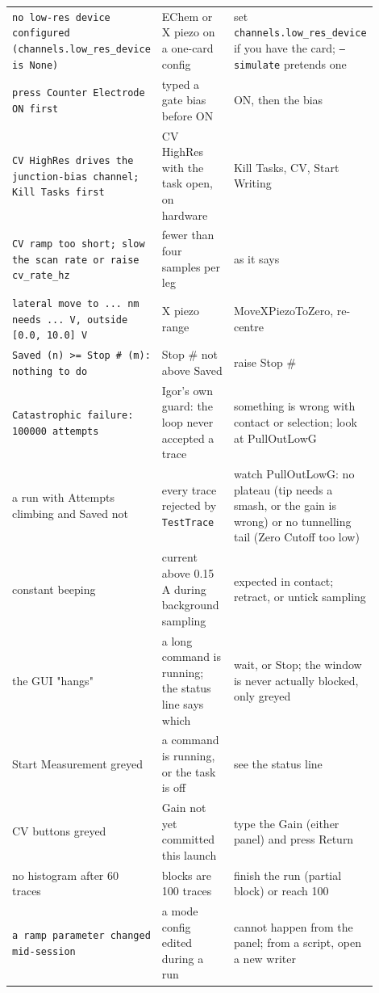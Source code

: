 \begin{longtable}{@{}>{\raggedright\arraybackslash}p{0.26\linewidth}>{\raggedright\arraybackslash}p{0.30\linewidth}>{\raggedright\arraybackslash}p{0.34\linewidth}@{}}
\texttt{no low-res device configured (channels.\discretionary{}{}{}low\_\discretionary{}{}{}res\_\discretionary{}{}{}device is None)} & EChem or X piezo on a one-card config & set \texttt{channels.\discretionary{}{}{}low\_\discretionary{}{}{}res\_\discretionary{}{}{}device} if you have the card; \texttt{--simulate} pretends one \\
\texttt{press Counter Electrode ON first} & typed a gate bias before ON & ON, then the bias \\
\texttt{CV High\discretionary{}{}{}Res drives the junction-bias channel; Kill Tasks first} & CV HighRes with the task open, on hardware & Kill Tasks, CV, Start Writing \\
\texttt{CV ramp too short; slow the scan rate or raise cv\_\discretionary{}{}{}rate\_\discretionary{}{}{}hz} & fewer than four samples per leg & as it says \\
\texttt{lateral move to .\discretionary{}{}{}.\discretionary{}{}{}.\discretionary{}{}{} nm needs .\discretionary{}{}{}.\discretionary{}{}{}.\discretionary{}{}{} V,\discretionary{}{}{} outside [0.\discretionary{}{}{}0,\discretionary{}{}{} 10.\discretionary{}{}{}0] V} & X piezo range & MoveXPiezoToZero, re-centre \\
\texttt{Saved (n) >= Stop \# (m): nothing to do} & Stop \# not above Saved & raise Stop \# \\
\texttt{Catastrophic failure: 100000 attempts} & Igor's own guard: the loop never accepted a trace & something is wrong with contact or selection; look at PullOutLowG \\
a run with Attempts climbing and Saved not & every trace rejected by \texttt{Test\discretionary{}{}{}Trace} & watch PullOutLowG: no plateau (tip needs a smash, or the gain is wrong) or no tunnelling tail (Zero Cutoff too low) \\
constant beeping & current above 0.15 \textmu{}A during background sampling & expected in contact; retract, or untick sampling \\
the GUI "hangs" & a long command is running; the status line says which & wait, or Stop; the window is never actually blocked, only greyed \\
Start Measurement greyed & a command is running, or the task is off & see the status line \\
CV buttons greyed & Gain not yet committed this launch & type the Gain (either panel) and press Return \\
no histogram after 60 traces & blocks are 100 traces & finish the run (partial block) or reach 100 \\
\texttt{a ramp parameter changed mid-session} & a mode config edited during a run & cannot happen from the panel; from a script, open a new writer \\
\bottomrule
\end{longtable}
\normalsize

